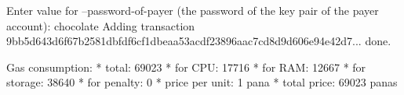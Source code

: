 \begin{shellbox}\begin{ttlst}
Enter value for --password-of-payer (the password of the key pair of the payer account): chocolate
Adding transaction 9bb5d643d6f67b2581dbfdf6cf1dbeaa53acdf23896aac7cd8d9d606e94e42d7... done.

Gas consumption:
 * total: 69023
   * for CPU: 17716
   * for RAM: 12667
   * for storage: 38640
   * for penalty: 0
 * price per unit: 1 pana
 * total price: 69023 panas
\end{ttlst}\end{shellbox}
